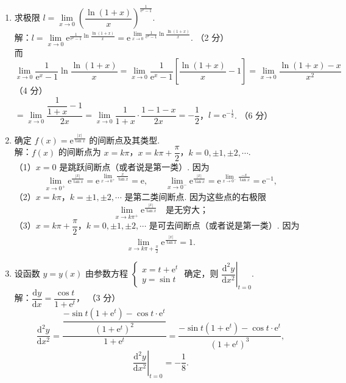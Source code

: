 \documentclass[a4paper,11pt]{ctexart}
\newcommand{\e}{\mathrm{e}}
\newcommand{\dd}{\mathrm{d}}
\newcommand{\score}[1]{\hfill（#1）}
\begin{document}
\begin{enumerate}[label=\arabic*., leftmargin=2em, itemsep=1.0em, topsep=0.5em]
  \item 求极限 $l = \lim\limits_{x\to 0}\left(\dfrac{\ln(1+x)}{x}\right)^{\frac{1}{\e^x - 1}}$.\\[0.3em]
  解：$l = \lim\limits_{x\to 0}\e^{\frac{1}{\e^x - 1}\ln\frac{\ln(1+x)}{x}} = \e^{\lim\limits_{x\to 0}\frac{1}{\e^x - 1}\ln\frac{\ln(1+x)}{x}}$. \score{2 分}\\[0.3em]
  而 $\lim\limits_{x\to 0}\dfrac{1}{\e^x - 1}\ln\dfrac{\ln(1+x)}{x} = \lim\limits_{x\to 0}\dfrac{1}{\e^x - 1}\left[\dfrac{\ln(1+x)}{x} - 1\right] = \lim\limits_{x\to 0}\dfrac{\ln(1+x) - x}{x^2}$ \score{4 分}\\[0.3em]
  $= \lim\limits_{x\to 0}\dfrac{\dfrac{1}{1+x} - 1}{2x} = \lim\limits_{x\to 0}\dfrac{1}{1+x}\cdot\dfrac{1 - 1 - x}{2x} = -\dfrac{1}{2}$，\quad $l = \e^{-\frac{1}{2}}$. \score{6 分}

  \item 确定 $f(x) = \e^{\frac{|x|}{\tan x}}$ 的间断点及其类型.\\[0.3em]
  解：$f(x)$ 的间断点为 $x = k\pi$，$x = k\pi + \dfrac{\pi}{2}$，$k = 0, \pm 1, \pm 2, \cdots$.\\[0.3em]
  （1）$x = 0$ 是跳跃间断点（或者说是第一类）. 因为
  \[
    \lim_{x\to 0^+}\e^{\frac{|x|}{\tan x}} = \e^{\lim\limits_{x\to 0^+}\frac{x}{\tan x}} = \e,\qquad
    \lim_{x\to 0^-}\e^{\frac{|x|}{\tan x}} = \e^{\lim\limits_{x\to 0^-}\frac{-x}{\tan x}} = \e^{-1}, \tag*{（2 分）}
  \]
  （2）$x = k\pi$，$k = \pm 1, \pm 2, \cdots$ 是第二类间断点. 因为这些点的右极限
  \[
    \lim_{x\to k\pi^+}\e^{\frac{|x|}{\tan x}} \quad\text{是无穷大；} \tag*{（4 分）}
  \]
  （3）$x = k\pi + \dfrac{\pi}{2}$，$k = 0, \pm 1, \pm 2, \cdots$ 是可去间断点（或者说是第一类）. 因为
  \[
    \lim_{x\to k\pi + \frac{\pi}{2}}\e^{\frac{|x|}{\tan x}} = 1. \tag*{（6 分）}
  \]

  \item 设函数 $y = y(x)$ 由参数方程 $\begin{cases} x = t + \e^t \\ y = \sin t \end{cases}$ 确定，则 $\left.\dfrac{\dd^2 y}{\dd x^2}\right|_{t=0}$.\\[0.3em]
  解：$\dfrac{\dd y}{\dd x} = \dfrac{\cos t}{1 + \e^t}$， \score{3 分}
  \[
    \frac{\dd^2 y}{\dd x^2} = \frac{\dfrac{-\sin t(1+\e^t) - \cos t \cdot \e^t}{(1+\e^t)^2}}{1+\e^t} = \frac{-\sin t(1+\e^t) - \cos t \cdot \e^t}{(1+\e^t)^3}, \tag*{（5 分）}
  \]
  \[
    \left.\frac{\dd^2 y}{\dd x^2}\right|_{t=0} = -\frac{1}{8}. \tag*{（6 分）}
  \]


\end{enumerate}
\end{document}
